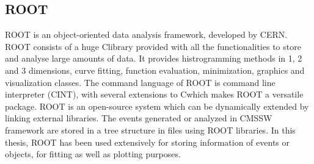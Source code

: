 \subsection{ROOT}
ROOT \cite{Brun:1997pa} is an object-oriented data analysis framework, developed by CERN. ROOT consists of a huge C\plusn\plus library provided with all the functionalities to store and analyse large amounts of data. It provides histrogramming methods in 1, 2 and 3 dimensions, curve fitting, function evaluation, minimization, graphics and visualization classes. The command language of ROOT is command line interpreter (CINT), with several extensions to C\plusn\plus which makes ROOT a versatile package. ROOT is an open-source system which can be dynamically extended by linking external libraries. The events generated or analyzed in CMSSW framework are stored in a tree structure in files using ROOT libraries. In this thesis, ROOT has been used extensively for storing information of events or objects, for fitting as well as plotting purposes.
